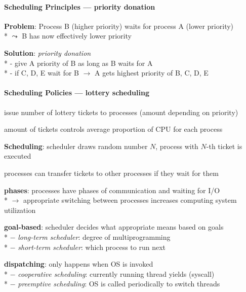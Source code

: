 \paragraph{Scheduling Principles --- priority donation}
\begin{items}
  \item \textbf{Problem}: Process B (higher priority) waits for process A (lower priority) \\*
    \( \leadsto \) B has now effectively lower priority
  \item \textbf{Solution}: \emph{priority donation} \\*
    - give A priority of B as long as B waits for A \\*
    - if C, D, E wait for B \( \to \) A gets highest priority of B, C, D, E
\end{items}

\paragraph{Scheduling Policies --- lottery scheduling}
\begin{items}
  \item issue number of lottery tickets to processes (amount depending on priority)
  \item amount of tickets controls average proportion of CPU for each process
  \item \textbf{Scheduling}: scheduler draws random number \( N \), process with \( N \)-th ticket is executed
  \item processes can transfer tickets to other processes if they wait for them
\end{items}

\begin{summary}
  \begin{items}
    \item \textbf{phases}: processes have phases of communication and waiting for I/O \\*
      $ \to $ appropriate switching between processes increases computing system utilization
    \item \textbf{goal-based}: scheduler decides what appropriate means based on goals \\*
      $ - $ \emph{long-term scheduler}: degree of multiprogramming \\*
      $ - $ \emph{short-term scheduler}: which process to run next
    \item \textbf{dispatching}: only happens when OS is invoked \\*
      $ - $ \emph{cooperative scheduling}: currently running thread yields (syscall) \\*
      $ - $ \emph{preemptive scheduling}: OS is called periodically to switch threads
  \end{items}
\end{summary}